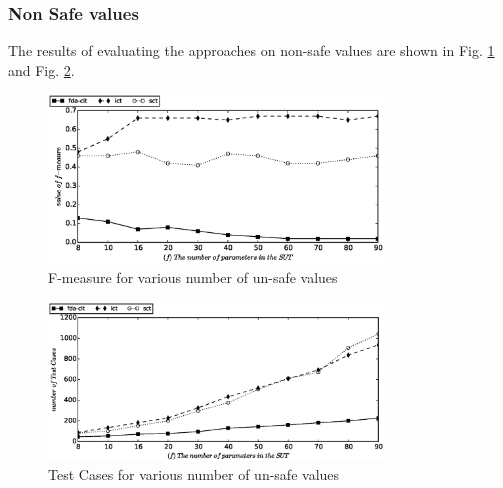 \documentclass[10pt,journal,compsoc]{IEEEtran}
\begin{document}






\subsubsection{Non Safe values}

The results of evaluating the approaches on non-safe values are shown in Fig. \ref{sen_safe_f_measure_result} and Fig. \ref{sen_safe_tests_result}.

\begin{figure}[htbp]
 \includegraphics[width=3.5in]{sen_safe_f_measure.eps}
\caption{F-measure for various number of un-safe values}
\label{sen_safe_f_measure_result}
\end{figure}


\begin{figure}[htbp]
 \includegraphics[width=3.5in]{sen_safe_tests.eps}
\caption{Test Cases for various number of un-safe values}
\label{sen_safe_tests_result}
\end{figure}
\end{document}

